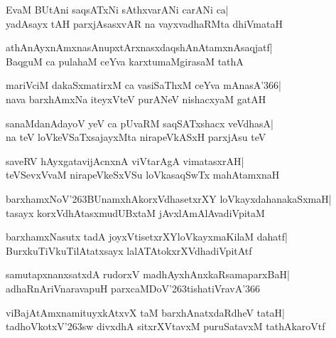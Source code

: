 \documentclass[twoside,12pt,openright]{book}
\def\S{\char'263}
\newcounter{shloka}[chapter]
\begin{document}
\begin{shloka}%
EvaM BUtAni saqsATxNi sAthxvarANi carANi ca|\\
yadAsayx tAH parxjAsasxvAR na vayxvadhaRMta dhiVmataH
\end{shloka}

\begin{shloka}%
athAnAyxnAmxnasAnupxtArxnasxdaqshAnAtamxnAsaqjatf|\\
BaqguM ca pulahaM ceYva karxtumaMgirasaM tathA
\end{shloka}

\begin{shloka}%
mariVciM dakaSxmatirxM ca vasiSaThxM ceYva mAnasA\char'366|\\
nava barxhAmxNa iteyxVteV purANeV nishacxyaM gatAH
\end{shloka}

\begin{shloka}%
sanaMdanAdayoV yeV ca pUvaRM saqSATxshacx veVdhasA|\\
na teV loVkeVSaTxsajayxMta nirapeVkASxH parxjAsu teV
\end{shloka}

\begin{shloka}%
saveRV hAyxgatavijAcnxnA viVtarAgA vimatasxrAH|\\
teVSevxVvaM nirapeVkeSxVSu loVkasaqSwTx mahAtamxnaH
\end{shloka}

\begin{shloka}%
barxhamxNoV\S BUnamxhAkorxVdhasetxrXY loVkayxdahanakaSxmaH|\\
tasayx korxVdhAtasxmudUBxtaM jAvxlAmAlAvadiVpitaM
\end{shloka}

\begin{shloka}%
barxhamxNasutx tadA joyxVtisetxrXYloVkayxmaKilaM dahatf|\\
BurxkuTiVkuTilAtatxsayx lalATAtokxrXVdhadiVpitAtf
\end{shloka}

\begin{shloka}%
samutapxnanxsatxdA rudorxV madhAyxhAnxkaRsamaparxBaH|\\
adhaRnAriVnaravapuH parxcaMDoV\S tishatiVravA\char'366
\end{shloka}

\begin{shloka}%
viBajAtAmxnamituyxkAtxvX taM barxhAnatxdaRdheV tataH|\\
tadhoVkotxV\S sw divxdhA sitxrXVtavxM puruSatavxM tathAkaroVtf
\end{shloka}
\end{document}
